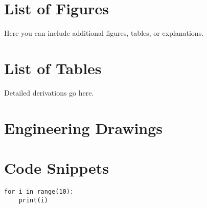 \newpage
\chapter{List of Figures}
Here you can include additional figures, tables, or explanations.

\newpage
\chapter{List of Tables}
Detailed derivations go here.

\newpage
\chapter{Engineering Drawings}

\newpage
\chapter{Code Snippets}

\begin{verbatim}
for i in range(10):
    print(i)
\end{verbatim}